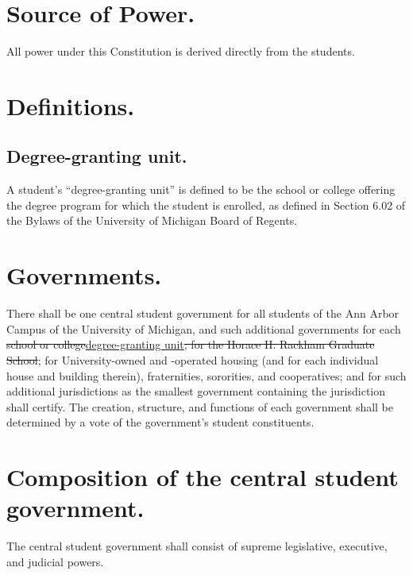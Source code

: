 
\section{Source of Power.}
All power under this Constitution is derived directly from the students.

\section{Definitions.}

\subsection{Degree-granting unit.}
A student's ``degree-granting unit'' is defined to be the school or college offering the degree program for which the student is enrolled, as defined in Section 6.02 of the Bylaws of the University of Michigan Board of Regents.

\section{Governments.}
There shall be one central student government for all students of the Ann Arbor Campus of the University of Michigan, and such additional governments for 
each \sout{school or college}\underline{degree-granting unit}\sout{; for the Horace H. Rackham Graduate School}; for University-owned and -operated housing (and for each individual house and building therein), fraternities, sororities, and cooperatives; and for such additional jurisdictions as the smallest government containing the jurisdiction shall certify. The creation, structure, and functions of each government shall be determined by a vote of the government's student constituents.

\section{Composition of the central student government.}
The central student government shall consist of supreme legislative, executive, and judicial powers.
